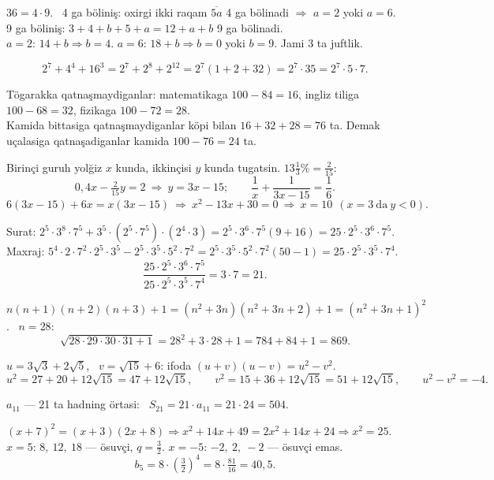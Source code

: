 




$36=4\cdot9$. \ 4 ga böliniş: oxirgi ikki raqam $\overline{5a}$ 4 ga bölinadi $\Rightarrow$ $a=2$ yoki $a=6$.\\
9 ga böliniş: $3+4+b+5+a=12+a+b$ 9 ga bölinadi.\\
$a=2$: $14+b\Rightarrow b=4$. \quad $a=6$: $18+b\Rightarrow b=0$ yoki $b=9$. \quad Jami 3 ta juftlik.

\[2^7+4^4+16^3=2^7+2^8+2^{12}=2^7(1+2+32)=2^7\cdot35=2^7\cdot5\cdot7.\]

Tögarakka qatnaşmaydiganlar: matematikaga $100-84=16$, ingliz tiliga $100-68=32$, fizikaga $100-72=28$.\\
Kamida bittasiga qatnaşmaydiganlar köpi bilan $16+32+28=76$ ta. Demak uçalasiga qatnaşadiganlar kamida $100-76=24$ ta.

Birinçi guruh yolğiz $x$ kunda, ikkinçisi $y$ kunda tugatsin. $13\frac13\%=\frac2{15}$:
\[0{,}4x-\tfrac2{15}y=2\ \Rightarrow\ y=3x-15;\qquad \frac1x+\frac1{3x-15}=\frac16.\]
\[6(3x-15)+6x=x(3x-15)\ \Rightarrow\ x^2-13x+30=0\ \Rightarrow\ x=10\ \ (x=3\ \text{da}\ y<0).\]

Surat: $2^5\cdot3^8\cdot7^5+3^5\cdot(2^5\cdot7^5)\cdot(2^4\cdot3)=2^5\cdot3^6\cdot7^5(9+16)=25\cdot2^5\cdot3^6\cdot7^5$.\\
Maxraj: $5^4\cdot2\cdot7^2\cdot2^5\cdot3^5-2^5\cdot3^5\cdot5^2\cdot7^2=2^5\cdot3^5\cdot5^2\cdot7^2(50-1)=25\cdot2^5\cdot3^5\cdot7^4$.
\[\frac{25\cdot2^5\cdot3^6\cdot7^5}{25\cdot2^5\cdot3^5\cdot7^4}=3\cdot7=21.\]

$n(n+1)(n+2)(n+3)+1=(n^2+3n)(n^2+3n+2)+1=(n^2+3n+1)^2$. \ $n=28$:
\[\sqrt{28\cdot29\cdot30\cdot31+1}=28^2+3\cdot28+1=784+84+1=869.\]

$u=3\sqrt3+2\sqrt5$, \ $v=\sqrt{15}+6$: ifoda $(u+v)(u-v)=u^2-v^2$.
\[u^2=27+20+12\sqrt{15}=47+12\sqrt{15},\qquad v^2=15+36+12\sqrt{15}=51+12\sqrt{15},\qquad u^2-v^2=-4.\]

$a_{11}$ — 21 ta hadning örtasi: \ $S_{21}=21\cdot a_{11}=21\cdot24=504$.

$(x+7)^2=(x+3)(2x+8)\Rightarrow x^2+14x+49=2x^2+14x+24\Rightarrow x^2=25$.\\
$x=5$: $8,\ 12,\ 18$ — ösuvçi, $q=\frac32$. \quad $x=-5$: $-2,\ 2,\ -2$ — ösuvçi emas.
\[b_5=8\cdot\left(\tfrac32\right)^4=8\cdot\tfrac{81}{16}=40{,}5.\]

